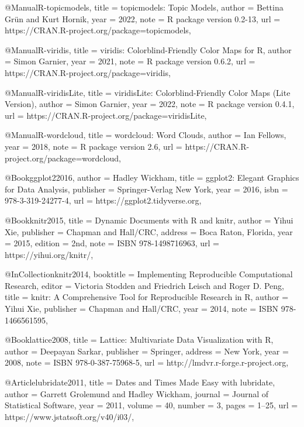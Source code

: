 @Manual{R-topicmodels,
  title = {topicmodels: Topic Models},
  author = {Bettina Grün and Kurt Hornik},
  year = {2022},
  note = {R package version 0.2-13},
  url = {https://CRAN.R-project.org/package=topicmodels},
}

@Manual{R-viridis,
  title = {viridis: Colorblind-Friendly Color Maps for R},
  author = {Simon Garnier},
  year = {2021},
  note = {R package version 0.6.2},
  url = {https://CRAN.R-project.org/package=viridis},
}

@Manual{R-viridisLite,
  title = {viridisLite: Colorblind-Friendly Color Maps (Lite Version)},
  author = {Simon Garnier},
  year = {2022},
  note = {R package version 0.4.1},
  url = {https://CRAN.R-project.org/package=viridisLite},
}

@Manual{R-wordcloud,
  title = {wordcloud: Word Clouds},
  author = {Ian Fellows},
  year = {2018},
  note = {R package version 2.6},
  url = {https://CRAN.R-project.org/package=wordcloud},
}

@Book{ggplot22016,
  author = {Hadley Wickham},
  title = {ggplot2: Elegant Graphics for Data Analysis},
  publisher = {Springer-Verlag New York},
  year = {2016},
  isbn = {978-3-319-24277-4},
  url = {https://ggplot2.tidyverse.org},
}

@Book{knitr2015,
  title = {Dynamic Documents with {R} and knitr},
  author = {Yihui Xie},
  publisher = {Chapman and Hall/CRC},
  address = {Boca Raton, Florida},
  year = {2015},
  edition = {2nd},
  note = {ISBN 978-1498716963},
  url = {https://yihui.org/knitr/},
}

@InCollection{knitr2014,
  booktitle = {Implementing Reproducible Computational Research},
  editor = {Victoria Stodden and Friedrich Leisch and Roger D. Peng},
  title = {knitr: A Comprehensive Tool for Reproducible Research in {R}},
  author = {Yihui Xie},
  publisher = {Chapman and Hall/CRC},
  year = {2014},
  note = {ISBN 978-1466561595},
}

@Book{lattice2008,
  title = {Lattice: Multivariate Data Visualization with R},
  author = {Deepayan Sarkar},
  publisher = {Springer},
  address = {New York},
  year = {2008},
  note = {ISBN 978-0-387-75968-5},
  url = {http://lmdvr.r-forge.r-project.org},
}

@Article{lubridate2011,
  title = {Dates and Times Made Easy with {lubridate}},
  author = {Garrett Grolemund and Hadley Wickham},
  journal = {Journal of Statistical Software},
  year = {2011},
  volume = {40},
  number = {3},
  pages = {1--25},
  url = {https://www.jstatsoft.org/v40/i03/},
}

